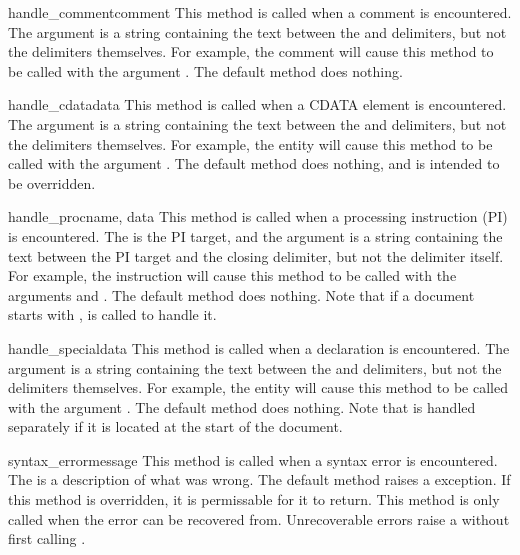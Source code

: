 \begin{methoddesc}{handle_comment}{comment}
This method is called when a comment is encountered.  The
 argument is a string containing the text between the
\samp{<!--} and \samp{-->} delimiters, but not the delimiters
themselves.  For example, the comment  will
cause this method to be called with the argument .  The
default method does nothing.
\end{methoddesc}

\begin{methoddesc}{handle_cdata}{data}
This method is called when a CDATA element is encountered.  The
 argument is a string containing the text between the
\samp{<![CDATA[} and \samp{]]>} delimiters, but not the delimiters
themselves.  For example, the entity \samp{<![CDATA[text]]>} will
cause this method to be called with the argument .  The
default method does nothing, and is intended to be overridden.
\end{methoddesc}

\begin{methoddesc}{handle_proc}{name, data}
This method is called when a processing instruction (PI) is
encountered.  The  is the PI target, and the 
argument is a string containing the text between the PI target and the
closing delimiter, but not the delimiter itself.  For example, the
instruction  will cause this method to be called
with the arguments  and .  The default method
does nothing.  Note that if a document starts with ,  is called to handle it.
\end{methoddesc}

\begin{methoddesc}{handle_special}{data}
This method is called when a declaration is encountered.  The
 argument is a string containing the text between the
\samp{<!} and \samp{>} delimiters, but not the delimiters
themselves.  For example, the entity  will
cause this method to be called with the argument .  The
default method does nothing.  Note that  is
handled separately if it is located at the start of the document.
\end{methoddesc}

\begin{methoddesc}{syntax_error}{message}
This method is called when a syntax error is encountered.  The
 is a description of what was wrong.  The default method 
raises a  exception.  If this method is
overridden, it is permissable for it to return.  This method is only
called when the error can be recovered from.  Unrecoverable errors
raise a  without first calling
.
\end{methoddesc}

